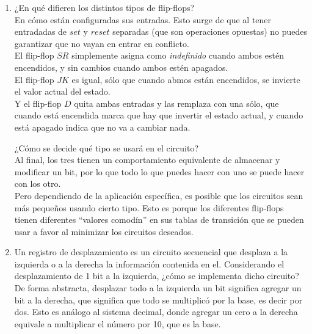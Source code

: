 \documentclass{article}
\begin{document}
    \begin{enumerate}
        \item 
            ¿En qué difieren los distintos tipos de flip-flops?\\
            En cómo están configuradas sus entradas. Esto surge de que al tener 
            entradadas de $set$ y $reset$ separadas (que son operaciones 
            opuestas) no puedes garantizar que no vayan en entrar 
            en conflicto. \\
            El flip-flop $SR$ simplemente asigna como \textit{indefinido} cuando 
            ambos estén encendidos, y sin cambios cuando ambos estén apagados. \\
            El flip-flop $JK$ es igual, sólo que cuando abmos están encendidos, 
            se invierte el valor actual del estado.\\
            Y el flip-flop $D$ quita ambas entradas y las remplaza con una sólo, 
            que cuando está encendida marca que hay que invertir el estado 
            actual, y cuando está apagado indica que no va a cambiar nada.
            
            
            ¿Cómo se decide qué tipo se usará en el circuito?\\
            Al final, los tres tienen un comportamiento equivalente de almacenar
            y modificar un bit, por lo que todo lo que puedes hacer con uno se 
            puede hacer con los otro.\\
            Pero dependiendo de la aplicación específica, es posible que 
            los circuitos sean más pequeños usando cierto tipo. Esto es porque
            los diferentes flip-flops tienen diferentes ``valores comodín'' en 
            sus tablas de transición que se pueden usar a favor al minimizar los 
            circuitos deseados.
            

		\item
            Un registro de desplazamiento es un circuito secuencial que 
            desplaza a la izquierda o a la derecha la información contenida en 
            el. 
            Considerando el desplazamiento de 1 bit a la izquierda, ¿cómo se 
            implementa dicho circuito?\\
            De forma abstracta, desplazar todo a la izquierda un bit significa 
            agregar un bit a la derecha, que significa que todo se multiplicó 
            por la base, es decir por dos. Esto es análogo al sistema decimal, 
            donde agregar un cero a la derecha equivale a multiplicar el número 
            por 10, que es la base.
        

\end{enumerate}
\end{document}

